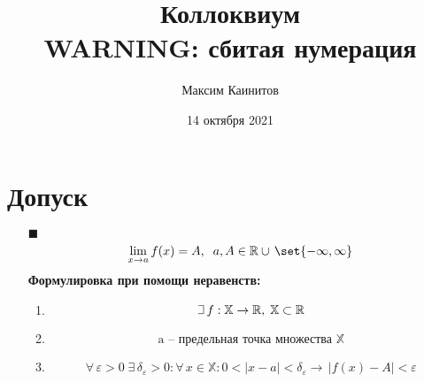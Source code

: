 \documentclass{article}
\title{%
  Коллоквиум \\
  \large WARNING: сбитая нумерация}
\author{Максим Каинитов}
\date{14 октября 2021}
\theoremstyle{plain}
\def\letus{%
    \mathord{\setbox0=\hbox{$\exists$}%
             \hbox{\kern 0.125\wd0%
                   \vbox to \ht0{%
                      \hrule width 0.75\wd0%
                      \vfill%
                      \hrule width 0.75\wd0}%
                   \vrule height \ht0%
                   \kern 0.125\wd0}%
           }%
}
\begin{document}
\maketitle
\section{Допуск}
\begin{enumerate}
\item[$\blacksquare$] $$\lim_{x \to a} f(x) = A, \;\; a, A \in \mathbb{R} \cup \, \set{-\infty, \infty} $$
\textbf{Формулировка при помощи неравенств:}
\begin{enumerate}
\item$$\letus{}\, f: \mathbb{X} \to \mathbb{R}, \; \mathbb{X} \subset \mathbb{R} $$
\item$$\text{a -- предельная точка множества } \mathbb{X}  $$
\item$$\forall\, \varepsilon > 0 \; \exists \, \delta_{\varepsilon} > 0 : \forall\, x \in \mathbb{X}: 0 < |x - a| < \delta_{\varepsilon} \rightarrow\, |f(x) - A| < \varepsilon$$
\end{enumerate}


\end{enumerate}
\end{document}
